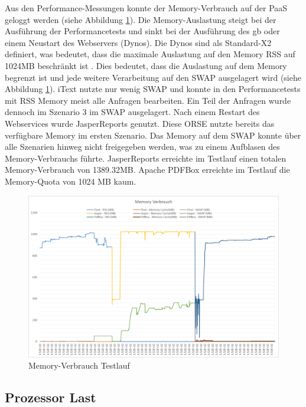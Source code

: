 \documentclass[main.tex]{subfiles}
\begin{document}
Aus den Performance-Messungen konnte der Memory-Verbrauch auf der PaaS geloggt werden (siehe Abbildung \ref{figure:memorytestlauf}). Die Memory-Auslastung steigt bei der Ausführung der Performancetests und sinkt bei der Ausführung des \acrshort{gb} oder einem Neustart des Webservers (Dynos). Die Dynos sind als Standard-X2 definiert, was bedeutet, dass die maximale Auslastung auf den Memory RSS auf 1024MB beschränkt ist \cite[vgl.~Kap~7.7]{hanjura_2014}. Dies bedeutet, dass die Auslastung auf dem Memory begrenzt ist und jede weitere Verarbeitung auf den SWAP ausgelagert wird (siehe Abbildung \ref{figure:memorytestlauf}). iText nutzte nur wenig SWAP und konnte in den Performancetests mit RSS Memory meist alle Anfragen bearbeiten. Ein Teil der Anfragen wurde dennoch im Szenario 3 im SWAP ausgelagert. Nach einem Restart des Webservices wurde JasperReports genutzt. Diese ORSE nutzte bereits das verfügbare Memory im ersten Szenario. Das Memory auf dem SWAP konnte über alle Szenarien hinweg nicht freigegeben werden, was zu einem Aufblasen des Memory-Verbrauchs führte. JasperReports erreichte im Testlauf einen totalen Memory-Verbrauch von 1389.32MB. Apache PDFBox erreichte im Testlauf die Memory-Quota von 1024 MB kaum.




\begin{figure}[H]
\includegraphics[width=\textwidth]{mainpart/4_analyse_img/MemoryVerbrauch.png}
 \caption{Memory-Verbrauch Testlauf}
 \label{figure:memorytestlauf}
\end{figure}



\subsection{Prozessor Last}
\end{document}
